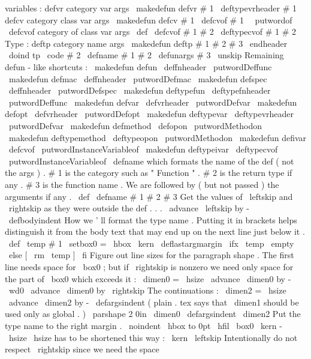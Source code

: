 {variables
:
%
defvr
category
var
args
\
makedefun
{
defvr
}
#
1
{
\
deftypevrheader
{
#
1
}
{
}
}
%
defcv
category
class
var
args
\
makedefun
{
defcv
}
#
1
{
\
defcvof
{
#
1
\
\
putwordof
}
}
%
\
defcvof
{
category
of
}
class
var
args
\
def
\
defcvof
#
1
#
2
{
\
deftypecvof
{
#
1
}
#
2
{
}
}
%
%
%
Type
:
%
deftp
category
name
args
\
makedefun
{
deftp
}
#
1
#
2
#
3
\
endheader
{
%
\
doind
{
tp
}
{
\
code
{
#
2
}
}
%
\
defname
{
#
1
}
{
}
{
#
2
}
\
defunargs
{
#
3
\
unskip
}
%
}
%
Remaining
defun
-
like
shortcuts
:
\
makedefun
{
defun
}
{
\
deffnheader
{
\
putwordDeffunc
}
}
\
makedefun
{
defmac
}
{
\
deffnheader
{
\
putwordDefmac
}
}
\
makedefun
{
defspec
}
{
\
deffnheader
{
\
putwordDefspec
}
}
\
makedefun
{
deftypefun
}
{
\
deftypefnheader
{
\
putwordDeffunc
}
}
\
makedefun
{
defvar
}
{
\
defvrheader
{
\
putwordDefvar
}
}
\
makedefun
{
defopt
}
{
\
defvrheader
{
\
putwordDefopt
}
}
\
makedefun
{
deftypevar
}
{
\
deftypevrheader
{
\
putwordDefvar
}
}
\
makedefun
{
defmethod
}
{
\
defopon
\
putwordMethodon
}
\
makedefun
{
deftypemethod
}
{
\
deftypeopon
\
putwordMethodon
}
\
makedefun
{
defivar
}
{
\
defcvof
\
putwordInstanceVariableof
}
\
makedefun
{
deftypeivar
}
{
\
deftypecvof
\
putwordInstanceVariableof
}
%
\
defname
which
formats
the
name
of
the
def
(
not
the
args
)
.
%
#
1
is
the
category
such
as
"
Function
"
.
%
#
2
is
the
return
type
if
any
.
%
#
3
is
the
function
name
.
%
%
We
are
followed
by
(
but
not
passed
)
the
arguments
if
any
.
%
\
def
\
defname
#
1
#
2
#
3
{
%
%
Get
the
values
of
\
leftskip
and
\
rightskip
as
they
were
outside
the
def
.
.
.
\
advance
\
leftskip
by
-
\
defbodyindent
%
%
How
we
'
ll
format
the
type
name
.
Putting
it
in
brackets
helps
%
distinguish
it
from
the
body
text
that
may
end
up
on
the
next
line
%
just
below
it
.
\
def
\
temp
{
#
1
}
%
\
setbox0
=
\
hbox
{
\
kern
\
deflastargmargin
\
ifx
\
temp
\
empty
\
else
[
\
rm
\
temp
]
\
fi
}
%
%
Figure
out
line
sizes
for
the
paragraph
shape
.
%
The
first
line
needs
space
for
\
box0
;
but
if
\
rightskip
is
nonzero
%
we
need
only
space
for
the
part
of
\
box0
which
exceeds
it
:
\
dimen0
=
\
hsize
\
advance
\
dimen0
by
-
\
wd0
\
advance
\
dimen0
by
\
rightskip
%
The
continuations
:
\
dimen2
=
\
hsize
\
advance
\
dimen2
by
-
\
defargsindent
%
(
plain
.
tex
says
that
\
dimen1
should
be
used
only
as
global
.
)
\
parshape
2
0in
\
dimen0
\
defargsindent
\
dimen2
%
%
Put
the
type
name
to
the
right
margin
.
\
noindent
\
hbox
to
0pt
{
%
\
hfil
\
box0
\
kern
-
\
hsize
%
\
hsize
has
to
be
shortened
this
way
:
\
kern
\
leftskip
%
Intentionally
do
not
respect
\
rightskip
since
we
need
the
space
}}}
